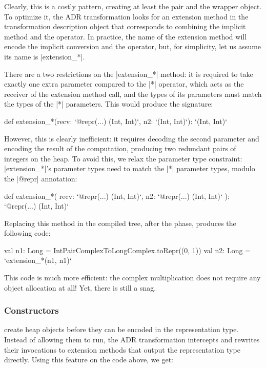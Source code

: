 Clearly, this is a costly pattern, creating at least the pair and the wrapper object. To optimize it, the ADR transformation looks for an extension method in the transformation description object that corresponds to combining the implicit method and the operator. In practice, the name of the extension method will encode the implicit conversion and the operator, but, for simplicity, let us assume its name is |extension_*|.

There are a two restrictions on the |extension_*| method: it is required to take exactly one extra parameter compared to the |*| operator, which acts as the receiver of the extension method call, and the types of its parameters must match the types of the |*| parameters. This would produce the signature:

\begin{lstlisting-nobreak}
def extension_*(recv: `@repr(...) (Int, Int)`, n2: `(Int, Int)`): `(Int, Int)`
\end{lstlisting-nobreak}

However, this is clearly inefficient: it requires decoding the second parameter and encoding the result of the computation, producing two redundant pairs of integers on the heap. To avoid this, we relax the parameter type constraint: |extension_*|'s parameter types need to match the |*| parameter types, modulo the |@repr| annotation:

\begin{lstlisting-nobreak}
def extension_*(
    recv: `@repr(...) (Int, Int)`,
    n2:   `@repr(...) (Int, Int)`
  ): `@repr(...) (Int, Int)`
\end{lstlisting-nobreak}

Replacing this method in the compiled tree, after the \commit{} phase, produces the following code:

\begin{lstlisting-nobreak}
val n1: Long = IntPairComplexToLongComplex.toRepr((0, 1))
val n2: Long = `extension_*(n1, n1)`
\end{lstlisting-nobreak}

This code is much more efficient: the complex multiplication does not require any object allocation at all! Yet, there is still a snag.

\subsubsection{Constructors} create heap objects before they can be encoded in the representation type. Instead of allowing them to run, the ADR transformation intercepts and rewrites their invocations to extension methods that output the representation type directly. Using this feature on the code above, we get:

